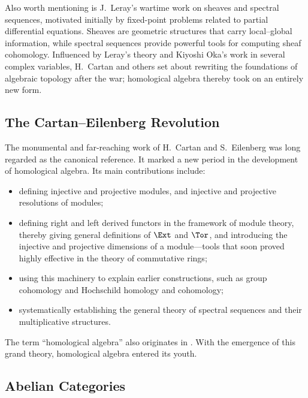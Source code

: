 Also worth mentioning is J.\ Leray's wartime work on sheaves and spectral sequences, motivated initially by fixed-point problems related to partial differential equations. Sheaves are geometric structures that carry local--global information, while spectral sequences provide powerful tools for computing sheaf cohomology. Influenced by Leray's theory and Kiyoshi Oka's work in several complex variables, H.\ Cartan and others set about rewriting the foundations of algebraic topology after the war; homological algebra thereby took on an entirely new form.

\subsection*{The Cartan--Eilenberg Revolution}

The monumental and far-reaching work of H.\ Cartan and S.\ Eilenberg \cite{CE56} was long regarded as the canonical reference. It marked a new period in the development of homological algebra. Its main contributions include:
\begin{itemize}
	\item defining injective and projective modules, and injective and projective resolutions of modules;
	\item defining right and left derived functors in the framework of module theory, thereby giving general definitions of $\Ext$ and $\Tor$, and introducing the injective and projective dimensions of a module---tools that soon proved highly effective in the theory of commutative rings;
	\item using this machinery to explain earlier constructions, such as group cohomology and Hochschild homology and cohomology;
	\item systematically establishing the general theory of spectral sequences and their multiplicative structures.
\end{itemize}

The term ``homological algebra'' also originates in \cite{CE56}. With the emergence of this grand theory, homological algebra entered its youth.

\subsection*{Abelian Categories}

